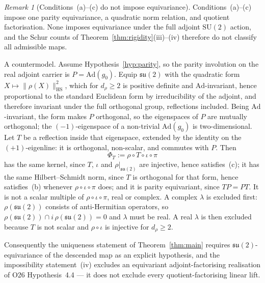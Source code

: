 \documentclass[11pt,a4paper]{article}
\theoremstyle{remark}
\newtheorem{remark}[theorem]{Remark}
\begin{document}
  \begin{remark}[Conditions~(a)--(c) do not impose equivariance]
    \label{rem:not-equivariant}
    Conditions~(a)--(c) impose one parity equivariance, a quadratic norm relation, and quotient
    factorisation.  None imposes equivariance under the full adjoint $\mathrm{SU}(2)$ action, and
    the Schur counts of Theorem~\ref{thm:rigidity}(iii)--(iv) therefore do not classify all
    admissible maps.

    A countermodel.  Assume Hypothesis~\ref{hyp:parity}, so the parity involution on the real
    adjoint carrier is $P = \mathrm{Ad}(g_0)$.
    Equip $\mathfrak{su}(2)$ with the quadratic form $X \mapsto \|\rho(X)\|_{\mathrm{HS}}^2$,
    which for $d_\rho \geq 2$ is positive definite and $\mathrm{Ad}$-invariant, hence
    proportional to the standard Euclidean form by irreducibility of the adjoint, and therefore
    invariant under the full orthogonal group, reflections included.
    Being $\mathrm{Ad}$-invariant, the form makes $P$ orthogonal, so the eigenspaces of $P$ are
    mutually orthogonal; the $(-1)$-eigenspace of a non-trivial $\mathrm{Ad}(g_0)$ is
    two-dimensional.
    Let $T$ be a reflection inside that eigenspace, extended by the identity on the
    $(+1)$-eigenline: it is orthogonal, non-scalar, and commutes with $P$.
    Then
    \[
      \Phi_T := \rho \circ T \circ \iota \circ \pi
    \]
    has the same kernel, since $T$, $\iota$ and $\rho|_{\mathfrak{su}(2)}$ are injective, hence
    satisfies~(c); it has the same Hilbert--Schmidt norm, since $T$ is orthogonal for that form,
    hence satisfies~(b) whenever $\rho \circ \iota \circ \pi$ does; and it is parity
    equivariant, since $TP = PT$.
    It is not a scalar multiple of $\rho \circ \iota \circ \pi$, real or complex.
    A complex $\lambda$ is excluded first: $\rho(\mathfrak{su}(2))$ consists of anti-Hermitian
    operators, so $\rho(\mathfrak{su}(2)) \cap i\,\rho(\mathfrak{su}(2)) = 0$ and
    $\lambda$ must be real.
    A real $\lambda$ is then excluded because $T$ is not scalar and $\rho \circ \iota$ is
    injective for $d_\rho \geq 2$.

    Consequently the uniqueness statement of Theorem~\ref{thm:main} requires
    $\mathfrak{su}(2)$-equivariance of the descended map as an explicit hypothesis, and the
    impossibility statement~(iv) excludes an equivariant adjoint-factorising realisation of O26
    Hypothesis~4.4 --- it does not exclude every quotient-factorising linear lift.
  \end{remark}
\end{document}
